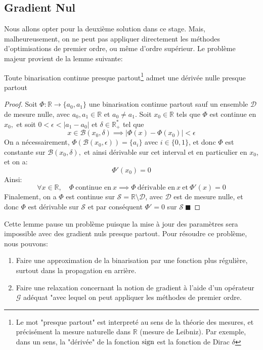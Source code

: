 \subsection{Gradient Nul}
Nous allons opter pour la deuxième solution dans ce stage. Mais, malheureusement, on ne peut pas appliquer directement les méthodes d'optimisations de premier ordre, ou même d'ordre supérieur.
\newline Le problème majeur provient de la lemme suivante:
 \begin{lemma}
 	Toute binarisation continue presque partout\footnote{Le mot "presque partout" est interpreté au sens de la théorie des mesures, et précisément la mesure naturelle dans $\mathbb{R}$ (mesure de Leibniz). Par exemple, dans un sens, la "dérivée" de la fonction $\operatorname{sign}$ est la fonction de Dirac $\delta$} admet une dérivée nulle presque partout
 \end{lemma}
\begin{proof}
	Soit $\Phi:\mathbb{R}\rightarrow \{a_0,a_1\}$ une binarisation continue partout sauf un ensemble $\mathcal{D}$ de mesure nulle, avec $a_0,a_1\in\mathbb{R}$ et $a_0\neq a_1.$
	\newline Soit $x_0\in\mathbb{R}$ tels que $\Phi$ est continue en $x_0,$ et soit $0 <\epsilon < \lvert a_1 -a_0 \rvert$ et $\delta\in\mathbb{R}_+^*$ tel que $$x\in\mathscr{B}(x_0,\delta)\implies \lvert \Phi(x)- \Phi(x_0)\rvert < \epsilon$$
	On a nécessairement, $\Phi(\mathscr{B}(x_0,\epsilon))= \{a_i\}$ avec $i\in\{0,1\}$, et donc $\Phi$ est constante sur $\mathscr{B}(x_0,\delta),$ et ainsi dérivable sur cet interval et en particulier en $x_0$, et on a: 
	$$
	\Phi'(x_0)=0
	$$
	Ainsi:
	$$
	\forall x\in\mathbb{R},\quad \Phi \ \text{continue en} \ x \implies \Phi \ \text{dérivable en} \ x \ \text{et}\ \Phi'(x)=0  
	$$
	Finalement, on a $\Phi$ est continue sur $\mathcal{S}=\mathbb{R}\setminus\mathcal{D}$, avec $\mathcal{D}$ est de mesure nulle, et donc $\Phi$ est dérivable sur $\mathcal{S}$  et par conséquent $\Phi'=0$ sur $\mathcal{S} \ \blacksquare$
\end{proof}
Cette lemme pause un problème puisque la mise à jour des paramètres sera impossible avec des gradient nuls presque partout.
\newline 
Pour résoudre ce problème, nous pouvons:
\begin{enumerate}
	\item Faire une approximation de la binarisation par une fonction plus régulière, surtout dans la propagation en arrière.
	\item Faire une relaxation concernant la notion de gradient à l'aide d'un opérateur $\mathcal{G}$ adéquat "avec lequel on peut appliquer les méthodes de premier ordre.
\end{enumerate} 
